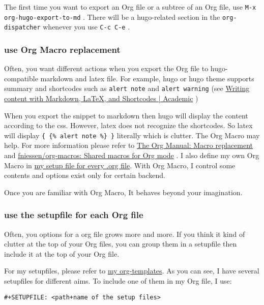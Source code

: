 \documentclass[koma,utopia,a4paper,captions=tableheading,11pt,listings-sv,microtype,paralist,colorlinks=true,urlcolor=blue]{org-article}
\begin{document}
The first time you want to export an Org file or a subtree of an Org file, use
\texttt{M-x org-hugo-export-to-md} . There will be a hugo-related section in the
\texttt{org-dispatcher} whenever you use \texttt{C-c C-e} .
\subsubsection{use Org Macro replacement}
\label{sec:orga32c0f1}


Often, you want different actions when you export the Org file to
hugo-compatible markdown and latex file. For example, hugo or hugo theme supports
summary and shortcodes such as \texttt{alert note} and \texttt{alert warning} (see  \href{https://sourcethemes.com/academic/docs/writing-markdown-latex/}{Writing
content with Markdown, \LaTeX{}, and Shortcodes | Academic} )

When you export the snippet to markdown then hugo will display the content
according to the css. However, latex does not recognize the shortcodes. So latex
will display \texttt{\{ \{\% alert note \%\} \}} literally which is clutter. The Org Macro may
help. For more information please refer to \href{https://orgmode.org/manual/Macro-replacement.html}{The Org Manual: Macro replacement} and
\href{https://github.com/fniessen/org-macros}{fniessen/org-macros: Shared macros for Org mode} . I also define my own Org Macro
in \href{https://github.com/msteamc/.spacemacs.d/blob/master/org-templates/enpost.org}{my setup file for every .org file}. With Org Macro, I control some contents
and options exist only for certain backend.

Once you are familiar with Org Macro, It behaves beyond your imagination.
\subsubsection{use the setupfile for each Org file}
\label{sec:org589cab1}


Often, you options for a org file grows more and more. If you think it kind of
clutter at the top of your Org files, you can group them in a setupfile then
include it at the top of your Org file.

For my setupfiles, please refer to \href{https://github.com/msteamc/.spacemacs.d/tree/master/org-templates}{my org-templates}. As you can see, I have
several setupfiles for different aims. To include one of them in my Org file, I
use:

\texttt{\#+SETUPFILE: <path+name of the setup files>}
\end{document}
